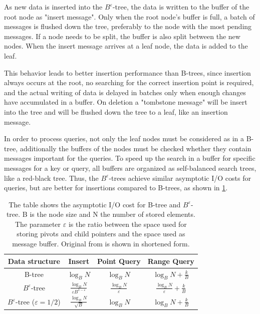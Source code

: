 \documentclass[
	12pt,
	a4paper,
	abstract,
	bibliography=totoc,
	chapterprefix,
	headings=openright,
	numbers=endperiod,
	parskip=half,
	twoside,
]{scrreprt}
\begin{document}
As new data is inserted into the $B^{\varepsilon}$-tree, the data is written to the buffer of the root node as "insert message".
Only when the root node's buffer is full, a batch of messages is flushed down the tree, preferably to the node with the most pending messages. 
If a node needs to be split, the buffer is also split between the new nodes.
When the insert message arrives at a leaf node, the data is added to the leaf.

This behavior leads to better insertion performance than B-trees, since insertion always occurs at the root, 
no searching for the correct insertion point is required, and  
the actual writing of data is delayed in batches only when enough changes have accumulated in a buffer.
On deletion a "tombstone message" will be insert into the tree and will be flushed down the tree to a leaf, like an insertion message.

In order to process queries, not only the leaf nodes must be considered as in a B-tree, 
additionally the buffers of the nodes must be checked whether they contain messages important for the queries.
To speed up the search in a buffer for specific messages for a key or query, 
all buffers are organized as self-balanced search trees, like a red-black tree.
Thus, the $B^{\varepsilon}$-trees achieve similar asymptotic I/O costs for queries, but are better for insertions compared to B-trees,
as shown in \cref{tab:comparison trees}.

\begin{table}[ht]
	\centering
	\begin{tabular}{|c|c|c|c|}
		\hline
		\textbf{Data structure} & \textbf{Insert} & \textbf{Point Query}  & \textbf{Range Query}\\
		\hline
		B-tree & $\log_{B} N$ & $\log_{B} N$ & $\log_{B} N + \frac{k}{B}$\\
		\hline
		$B^{\varepsilon}$-tree & $ \frac{\log_{B} N}{\varepsilon B^{1 - \varepsilon}}$ & $ \frac{\log_{B} N}{\varepsilon}$ 
		& $ \frac{\log_{B} N}{\varepsilon} + \frac{k}{B}$ \\
		\hline
		$B^{\varepsilon}$-tree ($\varepsilon = 1/2$) & $ \frac{\log_{B} N}{\sqrt{B}}$ & $\log_{B} N$ & $\log_{B} N + \frac{k}{B}$ \\
		\hline
	\end{tabular}
	\caption{The table shows the asymptotic I/O cost for B-tree and $B^{\varepsilon}$-tree.
			B is the node size and N the number of stored elements. 
			The parameter $\varepsilon$ is the ratio between the space used for storing pivots and 
			child pointers and the space used as message 	buffer. Original from \cite{bender2015introduction} is shown in shortened form.}
	\label{tab:comparison trees}
\end{table}
\end{document}

